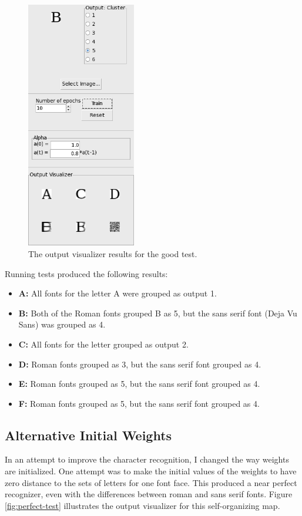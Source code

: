 \documentclass[12pt,letterpaper,oneside]{report}
\begin{document}
\begin{figure}[ht]
  \centering
  \includegraphics[width=180px]{diagrams/good-test.png} 
  \caption{The output visualizer results for the good test.}
  \label{fig:good-test}
\end{figure}

Running tests produced the following results:
\begin{itemize}
    \item\textbf{{A:}} All fonts for the letter A were grouped as output 1.
    \item\textbf{{B:}} Both of the Roman fonts grouped B as 5, but the sans serif font (Deja Vu Sans) was grouped as 4.
    \item\textbf{{C:}} All fonts for the letter grouped as output 2.
    \item\textbf{{D:}} Roman fonts grouped as 3, but the sans serif font grouped as 4.
    \item\textbf{{E:}} Roman fonts grouped as 5, but the sans serif font grouped as 4.
    \item\textbf{{F:}} Roman fonts grouped as 5, but the sans serif font grouped as 4.
\end{itemize}

\subsection{Alternative Initial Weights}
In an attempt to improve the character recognition, I changed the way weights are initialized. One attempt was to make the initial values of the weights to have zero distance to the sets of letters for one font face. This produced a near perfect recognizer, even with the differences between roman and sans serif fonts. Figure \ref{fig:perfect-test} illustrates the output visualizer for this self-organizing map.
\end{document}
